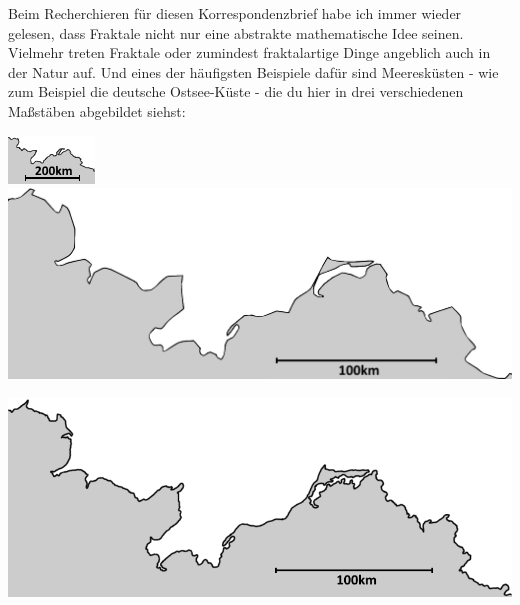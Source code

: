 \documentclass[a4paper,ngerman,12pt]{scrartcl}
\theoremstyle{definition}
\theoremstyle{plain}
\theoremstyle{remark}
\begin{document}
Beim Recherchieren für diesen Korrespondenzbrief habe ich immer wieder gelesen, dass Fraktale nicht nur eine abstrakte mathematische Idee seinen. Vielmehr treten Fraktale oder zumindest fraktalartige Dinge angeblich auch in der Natur auf. Und eines der häufigsten Beispiele dafür sind Meeresküsten - wie zum Beispiel die deutsche Ostsee-Küste - die du hier in drei verschiedenen Maßstäben abgebildet siehst:

\begin{center}
\includegraphics[width=.25\textwidth]{Bilder/Ostsee1.png}
\includegraphics[width=.65\textwidth]{Bilder/Ostsee2.png}

\includegraphics[width=.9\textwidth]{Bilder/Ostsee3.png}
\end{center}

\newpage
\end{document}
